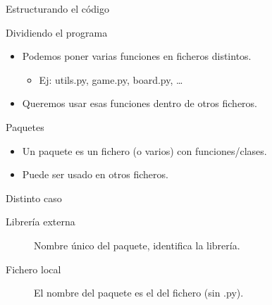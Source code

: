 \documentclass[bigger,unknownkeysallowed]{beamer}
\begin{document}
\begin{frame}[label={sec:orgf192ac4}]{Estructurando el código}
\begin{block}{Dividiendo el programa}
\begin{itemize}
\item Podemos poner varias funciones en ficheros distintos. 

\begin{itemize}
\item Ej: utils.py, game.py, board.py, \ldots{}
\end{itemize}

\item Queremos usar esas funciones dentro de otros ficheros.
\end{itemize}
\end{block}

\begin{block}{Paquetes}
\begin{itemize}
\item Un paquete es un fichero (o varios) con funciones/clases.

\item Puede ser usado en otros ficheros.
\end{itemize}
\end{block}

\begin{block}{Distinto caso}
\begin{description}
\item[{Librería externa}] Nombre único del paquete, identifica la librería.

\item[{Fichero local}] El nombre del paquete es el del fichero (sin .py).
\end{description}
\end{block}
\end{frame}
\end{document}
